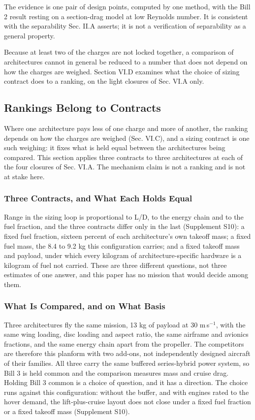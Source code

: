 \documentclass[journal]{new-aiaa}
\begin{document}
The evidence is one pair of design points, computed by one method, with the Bill 2 result resting on a section-drag model at low Reynolds number. It is consistent with the separability Sec. II.A asserts; it is not a verification of separability as a general property.

Because at least two of the charges are not locked together, a comparison of architectures cannot in general be reduced to a number that does not depend on how the charges are weighed. Section VI.D examines what the choice of sizing contract does to a ranking, on the light closures of Sec. VI.A only.

\subsection{Rankings Belong to Contracts}

Where one architecture pays less of one charge and more of another, the ranking depends on how the charges are weighed (Sec. VI.C), and a sizing contract is one such weighing: it fixes what is held equal between the architectures being compared. This section applies three contracts to three architectures at each of the four closures of Sec. VI.A. The mechanism claim is not a ranking and is not at stake here.

\subsubsection{Three Contracts, and What Each Holds Equal}

Range in the sizing loop is proportional to L/D, to the energy chain and to the fuel fraction, and the three contracts differ only in the last (Supplement S10): a fixed fuel fraction, sixteen percent of each architecture's own takeoff mass; a fixed fuel mass, the 8.4 to 9.2 kg this configuration carries; and a fixed takeoff mass and payload, under which every kilogram of architecture-specific hardware is a kilogram of fuel not carried. These are three different questions, not three estimates of one answer, and this paper has no mission that would decide among them.

\subsubsection{What Is Compared, and on What Basis}

Three architectures fly the same mission, 13 kg of payload at 30 m\,s$^{-1}$, with the same wing loading, disc loading and aspect ratio, the same airframe and avionics fractions, and the same energy chain apart from the propeller. The competitors are therefore this planform with two add-ons, not independently designed aircraft of their families. All three carry the same buffered series-hybrid power system, so Bill 3 is held common and the comparison measures mass and cruise drag. Holding Bill 3 common is a choice of question, and it has a direction. The choice runs against this configuration: without the buffer, and with engines rated to the hover demand, the lift-plus-cruise layout does not close under a fixed fuel fraction or a fixed takeoff mass (Supplement S10).
\end{document}

